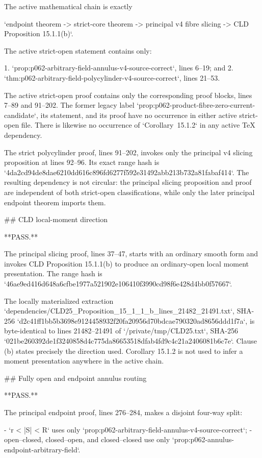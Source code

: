 The active mathematical chain is exactly

`endpoint theorem -> strict-core theorem -> principal v4 fibre slicing -> CLD Proposition 15.1.1(b)`.

The active strict-open statement contains only:

1. `prop:p062-arbitrary-field-annulus-v4-source-correct`, lines 6--19; and
2. `thm:p062-arbitrary-field-polycylinder-v4-source-correct`, lines 21--53.

The active strict-open proof contains only the corresponding proof blocks,
lines 7--89 and 91--202.  The former legacy label
`prop:p062-product-fibre-zero-current-candidate`, its statement, and its proof
have no occurrence in either active strict-open file.  There is likewise no
occurrence of `Corollary~15.1.2` in any active TeX dependency.

The strict polycylinder proof, lines 91--202, invokes only the principal v4
slicing proposition at lines 92--96.  Its exact range hash is
`4da2cd94de8dae6210dd616c896fd6277f592e31492abb213b732a81fabaf414`.
The resulting dependency is not circular: the principal slicing proposition
and proof are independent of both strict-open classifications, while only the
later principal endpoint theorem imports them.

## CLD local-moment direction

**PASS.**

The principal slicing proof, lines 37--47, starts with an ordinary smooth form
and invokes CLD Proposition 15.1.1(b) to produce an ordinary-open local moment
presentation.  The range hash is
`46ae9ed416d648a6cfbe1977a521902e106410f3990cd98f6e428d4bb0f57667`.

The locally materialized extraction
`dependencies/CLD25_Proposition_15_1_1_b_lines_21482_21491.txt`, SHA-256
`d2c41ff1bb5b3698e9124458932f20fa20956d70bdcae790320ad8656ddd1f7a`,
is byte-identical to lines 21482--21491 of `/private/tmp/CLD25.txt`, SHA-256
`021be260392de1f3240858d4c775da86653518dfab4fd9c4c21a2406081b6c7e`.
Clause (b) states precisely the direction used.  Corollary 15.1.2 is not used
to infer a moment presentation anywhere in the active chain.

## Fully open and endpoint annulus routing

**PASS.**

The principal endpoint proof, lines 276--284, makes a disjoint four-way split:

- `r < |S| < R` uses only
  `prop:p062-arbitrary-field-annulus-v4-source-correct`;
- open--closed, closed--open, and closed--closed use only
  `prop:p062-annulus-endpoint-arbitrary-field`.

